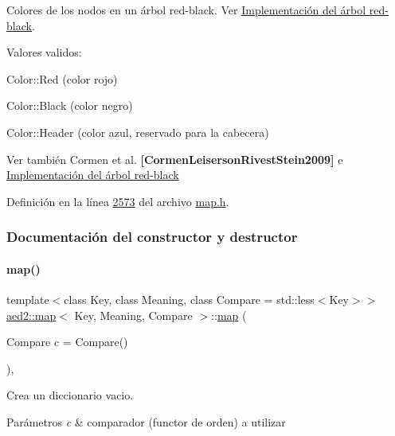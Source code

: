 Colores de los nodos en un árbol red-\/black. Ver \hyperlink{Implementacion}{Implementación del árbol red-\/black}. 

Valores validos\+: \begin{DoxyItemize}
\item Color\+::\+Red (color rojo) \item Color\+::\+Black (color negro) \item Color\+::\+Header (color azul, reservado para la cabecera)\end{DoxyItemize}
\begin{DoxySeeAlso}{Ver también}
Cormen et al. {\bfseries [Cormen\+Leiserson\+Rivest\+Stein2009]} e \hyperlink{Implementacion}{Implementación del árbol red-\/black} 
\end{DoxySeeAlso}


Definición en la línea \hyperlink{map_8h_source_l02573}{2573} del archivo \hyperlink{map_8h_source}{map.\+h}.



\subsubsection{Documentación del constructor y destructor}
\mbox{\label{classaed2_1_1map_a64da1d965b13eb28cdb3837bc17a18cf_a64da1d965b13eb28cdb3837bc17a18cf}} 
\paragraph{\texorpdfstring{map()}{map()}\hspace{0.1cm}{\footnotesize\ttfamily [1/3]}}
{\footnotesize\ttfamily template$<$class Key, class Meaning, class Compare = std\+::less$<$\+Key$>$$>$ \\
\hyperlink{classaed2_1_1map}{aed2\+::map}$<$ Key, Meaning, Compare $>$\+::\hyperlink{classaed2_1_1map}{map} (\begin{DoxyParamCaption}\item[{Compare}]{c = {\ttfamily Compare()} }\end{DoxyParamCaption})\hspace{0.3cm}{\ttfamily [inline]}, {\ttfamily [explicit]}}



Crea un diccionario vacio. 


\begin{DoxyParams}{Parámetros}
{\em c} & comparador (functor de orden) a utilizar \\
\hline
\end{DoxyParams}

